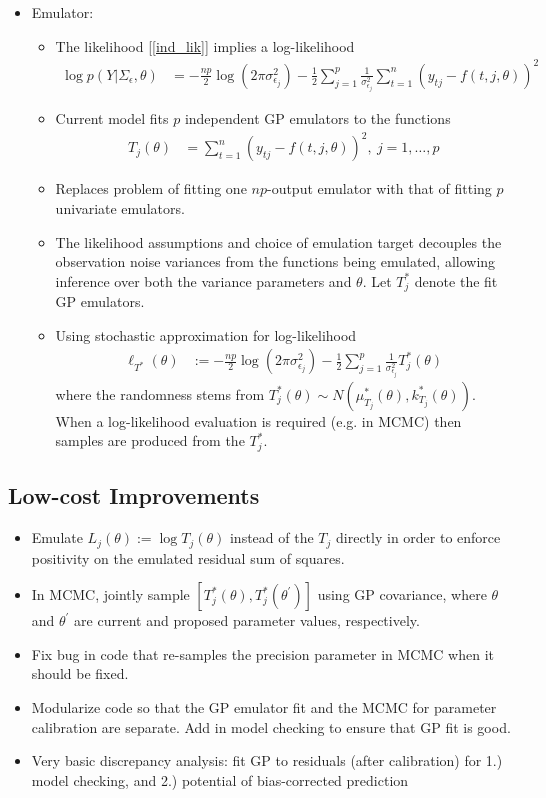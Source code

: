 \documentclass[12pt]{article}
\begin{document}
\begin{itemize}
\item Emulator:
	\begin{itemize}
	\item The likelihood [\ref{ind_lik}] implies a log-likelihood
	\begin{align}
	\log p(Y|\Sigma_\epsilon, \theta) &= -\frac{np}{2} \log(2\pi \sigma^2_{\epsilon_j}) - \frac{1}{2} \sum_{j = 1}^{p} \frac{1}{\sigma^2_{\epsilon_j}} \sum_{t = 1}^{n} (y_{tj} - f(t, j, \theta))^2
	\end{align}
	\item Current model fits $p$ independent GP emulators to the functions
	\begin{align}
	T_j(\theta) &= \sum_{t = 1}^{n} (y_{tj} - f(t, j, \theta))^2, \ j = 1, \dots, p
	\end{align} 
	\item Replaces problem of fitting one $np$-output emulator with that of fitting $p$ univariate emulators. 
	\item The likelihood assumptions and choice of emulation target decouples the observation noise variances from the functions being emulated, allowing inference over both the variance parameters
	and $\theta$. Let $T_j^*$ denote the fit GP emulators. 
	\item Using stochastic approximation for log-likelihood 
	\begin{align}
	\ell_{T^*}(\theta) &:= -\frac{np}{2} \log(2\pi \sigma^2_{\epsilon_j}) - \frac{1}{2} \sum_{j = 1}^{p} \frac{1}{\sigma^2_{\epsilon_j}} T_j^*(\theta)
	\end{align}
	where the randomness stems from $T_j^*(\theta) \sim N(\mu^*_{T_j}(\theta), k^*_{T_j}(\theta))$. When a log-likelihood evaluation is required (e.g. in MCMC) then samples are produced from the $T_j^*$.
	\end{itemize}
\end{itemize}

\subsection{Low-cost Improvements}
\begin{itemize}
\item Emulate $L_j(\theta) := \log T_j(\theta)$ instead of the $T_j$ directly in order to enforce positivity on the emulated residual sum of squares. 
\item In MCMC, jointly sample $[T_j^*(\theta), T_j^*(\theta^\prime)]$ using GP covariance, where $\theta$ and $\theta^\prime$ are current and proposed parameter values, respectively. 
\item Fix bug in code that re-samples the precision parameter in MCMC when it should be fixed. 
\item Modularize code so that the GP emulator fit and the MCMC for parameter calibration are separate. Add in model checking to ensure that GP fit is good. 
\item Very basic discrepancy analysis: fit GP to residuals (after calibration) for 1.) model checking, and 2.) potential of bias-corrected prediction
\end{itemize}
\end{document}
